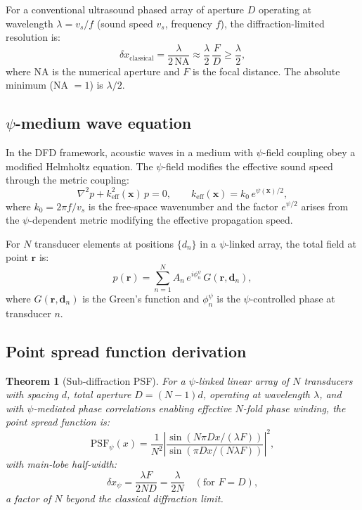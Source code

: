 \documentclass[aps,prl,twocolumn,superscriptaddress,showpacs]{revtex4-2}
\newtheorem{theorem}{Theorem}
\theoremstyle{definition}
\begin{document}
For a conventional ultrasound phased array of aperture $D$ operating
at wavelength $\lambda = v_s/f$ (sound speed $v_s$, frequency $f$),
the diffraction-limited resolution is:
\begin{equation}
\delta x_{\mathrm{classical}} = \frac{\lambda}{2\,\mathrm{NA}}
\approx \frac{\lambda}{2}\,\frac{F}{D} \geq \frac{\lambda}{2},
\label{eq:classical-diffraction}
\end{equation}
where NA is the numerical aperture and $F$ is the focal distance.
The absolute minimum (NA $= 1$) is $\lambda/2$.

\subsection{$\psi$-medium wave equation}

In the DFD framework, acoustic waves in a medium with $\psi$-field
coupling obey a modified Helmholtz equation. The $\psi$-field modifies
the effective sound speed through the metric coupling:
\begin{equation}
\nabla^2 p + k_{\mathrm{eff}}^2(\mathbf{x})\,p = 0, \qquad
k_{\mathrm{eff}}(\mathbf{x}) = k_0\,e^{\psi(\mathbf{x})/2},
\label{eq:modified-helmholtz}
\end{equation}
where $k_0 = 2\pi f/v_s$ is the free-space wavenumber and the factor
$e^{\psi/2}$ arises from the $\psi$-dependent metric modifying the
effective propagation speed.

For $N$ transducer elements at positions $\{d_n\}$ in a $\psi$-linked
array, the total field at point $\mathbf{r}$ is:
\begin{equation}
p(\mathbf{r}) = \sum_{n=1}^N A_n\,e^{i\phi_n^\psi}\,
G(\mathbf{r},\mathbf{d}_n),
\label{eq:total-field}
\end{equation}
where $G(\mathbf{r},\mathbf{d}_n)$ is the Green's function and
$\phi_n^\psi$ is the $\psi$-controlled phase at transducer $n$.

\subsection{Point spread function derivation}

\begin{theorem}[Sub-diffraction PSF]\label{thm:psf}
For a $\psi$-linked linear array of $N$ transducers with spacing
$d$, total aperture $D = (N-1)d$, operating at wavelength $\lambda$,
and with $\psi$-mediated phase correlations enabling effective $N$-fold
phase winding, the point spread function is:
\begin{equation}
\boxed{\mathrm{PSF}_\psi(x) = \frac{1}{N^2}\left|
\frac{\sin(N\pi D x/(\lambda F))}{\sin(\pi D x/(N\lambda F))}\right|^2},
\label{eq:psf-psi}
\end{equation}
with main-lobe half-width:
\begin{equation}
\delta x_\psi = \frac{\lambda F}{2ND} = \frac{\lambda}{2N}
\quad (\text{for } F = D),
\label{eq:resolution-psi}
\end{equation}
a factor of $N$ beyond the classical diffraction limit.
\end{theorem}
\end{document}
